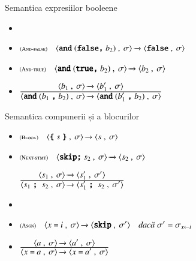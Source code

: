 \documentclass[xcolor=pdftex,romanian,colorlinks]{beamer}
\begin{document}
\begin{frame}[fragile]{Semantica expresiilor booleene}
\vspace*{0.5cm}
 
  \begin{itemize}
 

 
    \item {} 
   
   \smallskip
    \item[] $\reg[And-false]{\Ss{\Conf{\terminal{and}(\terminal{false}\terminal{,} b_2)}{\sigma}}  {\Conf{\terminal{false}}{\sigma}}}{}{}$
      
    \item[] $\reg[And-true]{\Ss{\Conf{\terminal{and}(\terminal{true}\terminal{,}  b_2)}{\sigma}}  {\Conf{b_2}{\sigma}}}{}{}$
     \bigskip
    \item[] $\reg{\Ss{\Conf{\terminal{and}(b_1 \terminal{,} b_2)}{\sigma}}  {\Conf{\terminal{and}(b_1' \terminal{,} b_2)}{\sigma}}}{\Ss{\Conf{b_1}{\sigma}}  {\Conf{b_1'}{\sigma}}}{}$

\end{itemize}
 

\end{frame}


  \begin{frame}[fragile]{Semantica compunerii și a blocurilor}
\vspace*{0.5cm}
 
 
    \begin{itemize}
  \item {} 
  
  \smallskip 
  $\reg[Block]{\Ss{\Conf{\terminal{\{} s \terminal{\}}}{\sigma}}   {\Conf{ s}{\sigma}}}{}{}$
  
  
      \medskip
   \item {}
   
   \smallskip
   $\reg[Next-stmt]{\Ss{\Conf{\terminal{skip}\terminal{;} s_2}{\sigma}}  {\Conf{s_2}{\sigma}}}{}{}$
   
   \medskip
  $ \reg{\Ss{\Conf{s_1\terminal{;}\ s_2}{\sigma}}  {\Conf{s_1'\terminal{;}\ s_2}{\sigma'}}}{\Ss{\Conf{s_1}{\sigma}}  {\Conf{s_1'}{\sigma'}}}{}$

    \medskip
  \item {} 
  \smallskip
    \item[] $\reg[Asgn]{\Ss{\Conf{x \terminal{=} i}{\sigma}}  {\Conf{\terminal{skip}}{\sigma'}}}{}{\sigma'=\sigma_{x\leftarrow i} }$
   \medskip
  \item[] $\reg{\Ss{\Conf{x \terminal{=} a}{\sigma}}  {\Conf{x \terminal{=} a'}{\sigma}}}{\Ss{\Conf{a}{\sigma}}  {\Conf{a'}{\sigma}}}{}$
  
\end{itemize}
 

  \end{frame}  
\end{document}
